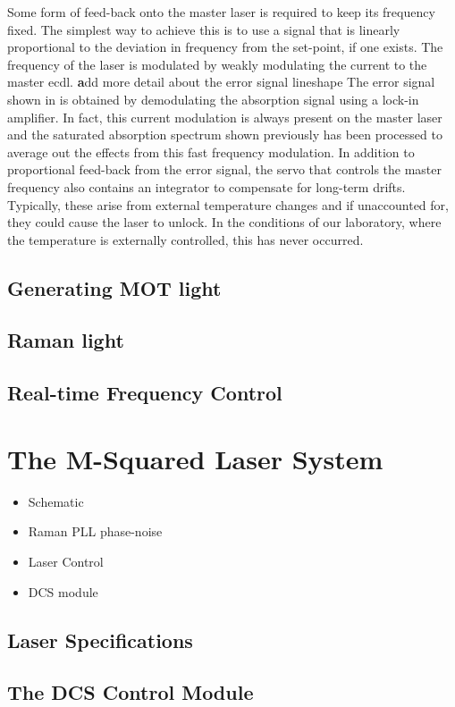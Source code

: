 Some form of feed-back onto the master laser is required to keep its frequency fixed. The simplest way to achieve this is to use a signal that is linearly proportional to the deviation in frequency from the set-point, if one exists. The frequency of the laser is modulated by weakly modulating the current to the master \ac{ecdl}. {\textbf add more detail about the error signal lineshape} The error signal shown in  is obtained by demodulating the absorption signal using a lock-in amplifier. In fact, this current modulation is always present on the master laser and the saturated absorption spectrum shown previously has been processed to average out the effects from this fast frequency modulation. In addition to proportional feed-back from the error signal, the servo that controls the master frequency also contains an integrator to compensate for long-term drifts. Typically, these arise from external temperature changes and if unaccounted for, they could cause the laser to unlock. In the conditions of our laboratory, where the temperature is externally controlled, this has never occurred.  
\subsection{Generating MOT light}
\subsection{Raman light}
\subsection{Real-time Frequency Control}
\section{The M-Squared Laser System}\label{sec:setup_msquared}
\begin{itemize}
    \item Schematic
    \item Raman PLL phase-noise
    \item Laser Control
    \item DCS module
\end{itemize}
\subsection{Laser Specifications}
\subsection{The DCS Control Module}
